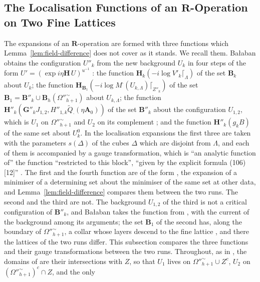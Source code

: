 
\subsection{The Localisation Functions of an $\mathbf R$-Operation on Two Fine Lattices}\label{sec:localisation-functions}

The expansions of an $\mathbf R$-operation are formed with three functions which Lemma~\ref{lem:field-difference} does not cover as it stands. We recall them. Ba{\l}aban obtains the configuration $U''_k$ from the new background $U_k$ in four steps of the form $U' = (\exp i\eta\mathbf H\,U)^{u^{-1}}$ \cite[(1.51), (1.54), (1.57), (1.58), pp.~370--371]{BalabanLFR2}: the function $\mathbf H_k(-i\log V'_k\lceil_\Lambda)$ of the set $\mathbf B_k$ about $U_k$; the function $\mathbf H_{\mathbf B_1}(-i\log M^\cdot(U_{k,\Lambda})\lceil_{Z''_k})$ of the set $\mathbf B_1 = \mathbf B''_k \cup \mathbf B_h(\Omega''^\sim_{h+1})$ about $U_{k,\Lambda}$; the function $\mathbf H''_k(\mathbf G''_kJ_{1,2}, H''_{1,k}\tilde Q_\cdot(\eta\mathbf A_0))$ of the set $\mathbf B''_k$ about the configuration $U_{1,2}$, which is $U_1$ on $\Omega''^\sim_{h+1}$ and $U_2$ on its complement \cite[(1.52), (1.53)]{BalabanLFR2}; and the function $\mathbf H''_k(g_kB)$ of the same set about $U^0_k$. In the localisation expansions \cite[(1.61)--(1.64), pp.~373--374]{BalabanLFR2} the first three are taken with the parameters $s(\Delta)$ of the cubes $\Delta$ which are disjoint from $\Lambda$, and each of them is accompanied by a gauge transformation, which is ``an analytic function of'' the function ``restricted to this block'', ``given by the explicit formula (106) [12]'' \cite[p.~373]{BalabanLFR2}. The first and the fourth function are of the form \cite[(179), (180)]{BalabanVAR}, the expansion of a minimiser of a determining set about the minimiser of the same set at other data, and Lemma~\ref{lem:field-difference} compares them between the two runs. The second and the third are not. The background $U_{1,2}$ of the third is not a critical configuration of $\mathbf B''_k$, and Ba{\l}aban takes the function from \cite[Sects.~D, E]{BalabanVAR}, with the current of the background among its arguments; the set $\mathbf B_1$ of the second has, along the boundary of $\Omega''^\sim_{h+1}$, a collar whose layers descend to the fine lattice \cite[p.~256, ll.~57--62; (2.14), p.~257]{BalabanCRE}, and there the lattices of the two runs differ. This subsection compares the three functions and their gauge transformations between the two runs. Throughout, as in \cite[p.~177, ll.~33--35]{BalabanLFR1}, the domains of \cite[(1.50)--(1.55)]{BalabanLFR2} are their intersections with $Z$, so that $U_1$ lives on $\Omega''^\sim_{h+1} \cup Z^c$, $U_2$ on $(\Omega''^\sim_{h+1})^c \cap Z$, and the only 